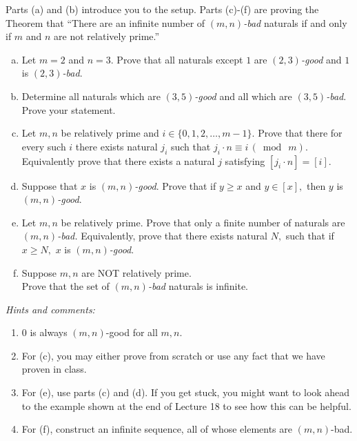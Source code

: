 \documentclass[12pt]{article}
\begin{document}
Parts (a) and (b) introduce you to the setup. Parts (c)-(f) are proving the Theorem that ``There are an infinite number of {\em $(m,n)$-bad} naturals if and only if $m$ and $n$ are not relatively prime.''

 \begin{enumerate}[a)]
    \item Let $m = 2$ and $n = 3.$ Prove that all  naturals except  $1$  are {\em $(2,3)$-good} and 
    $1$ is {\em $(2,3)$-bad}. 
    \item Determine all  naturals which are {\em $(3,5)$-good} and all which are {\em $(3,5)$-bad}. Prove your statement.
    \item Let  $m,n$ be relatively prime and $i \in \{0,1,2,\ldots,m-1\}.$ Prove that there for every such $i$ there exists natural $j_i$ such that $j_i \cdot n \equiv i  \, (\bmod \ m)$.  \\
    Equivalently prove that
    there exists a natural $j$ satisfying $[j_i \cdot n]= [i]$. 
    \item Suppose  that  $x$ is {\em $(m,n)$-good}. Prove that  if  $y \ge x$ and $y\in [x],$ then $y$ is {\em $(m,n)$-good}.
    \item Let $m,n$ be relatively prime. Prove that only  a finite number of naturals are {\em $(m,n)$-bad.} 
    Equivalently, prove that there exists natural $N,$ such that if  $x \ge N,$ $x$ is {\em $(m,n)$-good}.
    \item Suppose $m,n$ are NOT relatively prime.\\  Prove that the set of {\em $(m,n)$-bad} naturals is infinite.
    
\end{enumerate}

{\em \small Hints and comments:
\begin{enumerate}[1.]
\item $0$ is always $(m,n)$-good for all $m,n.$
\item For (c), you may either prove from scratch or use any fact that we have proven in class.
\item For (e), use parts (c) and (d). If you get stuck, you might want to look ahead to the example shown at the end of Lecture 18 to see how this can be helpful.
\item  For (f), construct an infinite sequence, all of whose elements are $(m,n)$-bad.
\end{enumerate}
}
\end{document}
